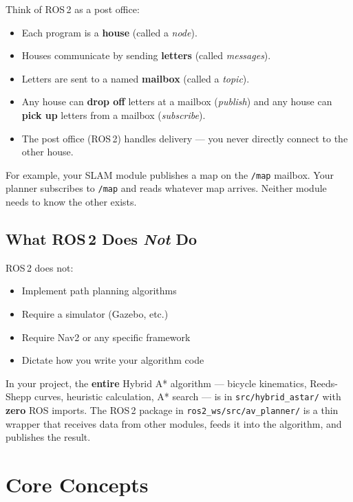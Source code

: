 \documentclass[12pt, a4paper]{article}
\begin{document}
Think of ROS\,2 as a post office:
\begin{itemize}[nosep]
    \item Each program is a \textbf{house} (called a \emph{node}).
    \item Houses communicate by sending \textbf{letters} (called \emph{messages}).
    \item Letters are sent to a named \textbf{mailbox} (called a \emph{topic}).
    \item Any house can \textbf{drop off} letters at a mailbox (\emph{publish})
          and any house can \textbf{pick up} letters from a mailbox (\emph{subscribe}).
    \item The post office (ROS\,2) handles delivery --- you never directly
          connect to the other house.
\end{itemize}

For example, your SLAM module publishes a map on the \texttt{/map} mailbox.
Your planner subscribes to \texttt{/map} and reads whatever map arrives.
Neither module needs to know the other exists.

\subsection{What ROS\,2 Does \emph{Not} Do}

ROS\,2 does not:
\begin{itemize}[nosep]
    \item Implement path planning algorithms
    \item Require a simulator (Gazebo, etc.)
    \item Require Nav2 or any specific framework
    \item Dictate how you write your algorithm code
\end{itemize}

In your project, the \textbf{entire} Hybrid A* algorithm --- bicycle kinematics,
Reeds-Shepp curves, heuristic calculation, A* search --- is in
\texttt{src/hybrid\_astar/} with \textbf{zero} ROS imports.
The ROS\,2 package in \texttt{ros2\_ws/src/av\_planner/} is a thin wrapper
that receives data from other modules, feeds it into the algorithm,
and publishes the result.


\section{Core Concepts}
\end{document}
